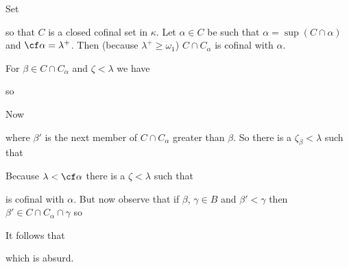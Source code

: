 {


\noindent Set


\noindent so that $C$ is a closed cofinal set in $\kappa$.   Let
$\alpha\in C$ be such that $\alpha=\sup(C\cap\alpha)$ and
$\cf\alpha=\lambda^+$.
Then (because $\lambda^+\ge\omega_1$) $C\cap C_{\alpha}$ is cofinal
with $\alpha$.

For $\beta\in C\cap C_{\alpha}$ and $\zeta<\lambda$ we have


\noindent so


\noindent Now


\noindent where $\beta'$ is the next member of $C\cap C_{\alpha}$
greater than $\beta$.
So there is a $\zeta_{\beta}<\lambda$ such that


\noindent Because $\lambda<\cf\alpha$ there is a $\zeta<\lambda$
such that


\noindent is cofinal with $\alpha$.   But now observe that if
$\beta$, $\gamma\in B$ and $\beta'<\gamma$ then
$\beta'\in C\cap C_{\alpha}\cap\gamma$ so


\noindent It follows that


\noindent which is absurd.\ \Bang\Qed

\medskip

}
